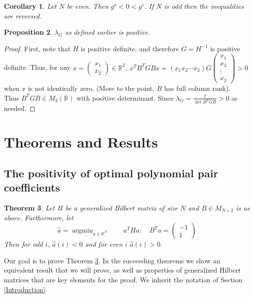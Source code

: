 \documentclass{article}
\newtheorem{thm}{Theorem}[section]
\newtheorem{cor}[thm]{Corollary}
\newtheorem{prop}[thm]{Proposition}
\theoremstyle{definition}
\theoremstyle{remark}
\numberwithin{equation}{section}
\DeclareMathOperator{\argmin}{argmin}
\begin{document}
\begin{cor}
Let $N$ be even. Then $g^o < 0 < g^e$. If $N$ is odd then the inequalities are reversed.
\end{cor}

\begin{prop}\label{inverse-determinant-is-positive}
$\lambda_G$ as defined earlier is positive.
\end{prop}
\begin{proof}
First, note that $H$ is positive definite, and therefore $G=H^{-1}$ is positive definite. Thus, for any $x= \begin{pmatrix} x_1 \\ x_2 \end{pmatrix} \in \mathbb{R}^2$, $x^T B^TGBx = (x_1 x_2 \cdots x_2) G \begin{pmatrix} x_1 \\ x_2 \\ \vdots \\ x_2 \end{pmatrix} > 0$ when $x$ is not identically zero. (More to the point, $B$ has full column rank). \\
Thus $B^TGB \in M_2(\mathbb{R})$ with positive determinant. Since $\lambda_G = \frac{1}{\det B^TG B} >0 $ as needed.
\end{proof}

\section{Theorems and Results}
\subsection{The positivity of optimal polynomial pair coefficients}

\begin{thm}\label{positivity-hilbert-coefficients}
Let $H$ be a generalized Hilbert matrix of size $N$ and $B \in M_{N\times 2}$ is as above. Furthermore, let 
\[ \hat{a} = \argmin_{a\in\mathbb{R}^N} \quad \quad a^THa : \quad B^Ta = \begin{pmatrix} -1 \\ 1 \end{pmatrix}\]
Then for odd $i$, $\hat{a}(i) < 0$ and for even $i$ $\hat{a}(i) > 0$.
\end{thm} 

Our goal is to prove Theorem \ref{positivity-hilbert-coefficients}. In the succeeding theorems we show an equivalent result that we will prove, as well as properties of generalized Hilbert matrices that are key elements for the proof. We inherit the notation of Section \ref{Introduction}.
\end{document}
